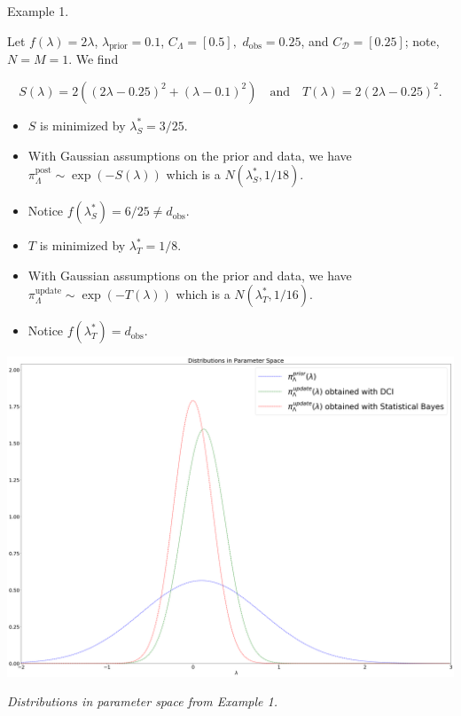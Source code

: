 \documentclass[11pt]{beamer}
\begin{document}
\begin{frame}

\begin{block}{Example 1.}

\noindent Let $f(\lambda)=2\lambda$, $\lambda_\text{prior}=0.1$, $C_\Lambda=[0.5],$ $d_\text{obs}=0.25$, and $C_\mathcal{D}=[0.25]$; note, $N=M=1$. We find

$$S(\lambda)=2((2\lambda-0.25)^2+(\lambda-0.1)^2) \quad \text{and} \quad T(\lambda)=2(2\lambda-0.25)^2.$$

\begin{itemize}

	\item $S$ is minimized by $\lambda^*_S=3/25$. 
	
	\item With Gaussian assumptions on the prior and data, we have $\pi_\Lambda^\text{post} \sim \exp(-S(\lambda))$ which is a $N(\lambda_S^*, 1/18)$. 
	
	\item Notice $f(\lambda^*_S)=6/25\neq d_\text{obs}$. 
	
 

	\item $T$ is minimized by $\lambda^*_T=1/8$. 
	
	\item With Gaussian assumptions on the prior and data, we have $\pi_\Lambda^\text{update} \sim \exp(-T(\lambda))$ which is a  $N(\lambda_T^*, 1/16)$.
	
	\item Notice $f(\lambda^*_T)=d_\text{obs}$. 

\end{itemize}
\end{block}


\end{frame}

\begin{frame}

\begin{center} 
\includegraphics[scale=0.125]{param}

\textit{Distributions in parameter space from Example 1.}
\end{center}

\end{frame}
\end{document}
